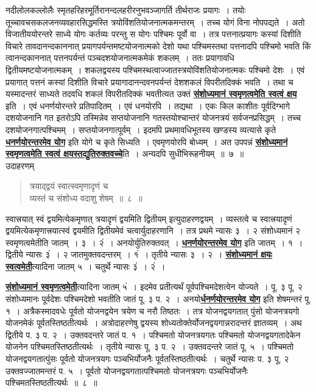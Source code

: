 \documentclass[11pt, openany]{book}
\begin{document}
\noindent नदीलोलकल्लोलैः स्मृतहरिहरमूर्तिरानन्दलहरीरनुभवञ्जागर्ति तीर्थराजः प्रयागः~।
तयोः तूच्चावचसकलजनव्यवहारसिद्धमस्ति त्रयोविंशतियोजनात्मकमन्तरम्~।
तच्च योगं विना नोपपद्यते~। अतो विजातीययोरन्तरे साध्ये योगः कर्तव्यः
परन्तु स योगः पश्चिमः पूर्वो वा~। तत्र पत्तनात्प्रयागः कस्यां दिशीति
विचारे तावदानन्दकाननात् प्रयागपर्यन्तमष्टयोजनात्मको देशो यथा
पश्चिमस्तथा पत्तनादपि पश्चिमो भवति किं त्वानन्दकाननात् पत्तनपर्यन्तं
पञ्चदशयोजनात्मकमेकं शकलम्~। ततः प्रयागावधि द्वितीयमष्टयोजनात्मकम्~। 
शकलद्वयस्य पश्चिमस्थत्वाज्जातस्त्रयोविंशतियोजनात्मकः पश्चिमो देशः~। एवं
प्रयागात् पत्तनं कस्यां दिशीति विचारे प्रयागादानन्दवनपर्यन्तं देशशकलं विपरीतदिक्कं
भवति~। तथा च यस्मादन्तरं साध्यते तदवधि शकलं विपरीतदिक्कं
भवतीत्यत उक्तं \hyperref[7]{\textbf{संशोध्यमानं स्वमृणत्वमेति स्वत्वं क्षय}} इति~। एवं
धनर्णयोरन्तरे प्रतिपादितम्~। एवं धनयोरपि~। तद्यथा~। एकः किल काशीतः
पूर्वदिग्भागे दशयोजनानि गत इतरोऽपि तस्मिन्नेव सप्तयोजनानि
गतस्तयोश्चान्तरं योजनत्रयं सर्वजनप्रसिद्धम्~। तच्च दशयोजनगात्पश्चिमम्~।
सप्तयोजनगात्पूर्वम्~। इदमपि प्रथमावधिभूतस्य खण्डस्य व्यत्यासे कृते \hyperref[3]{\textbf{धनर्णयोरन्तरमेव योग}} इति योगे च कृते सिध्यति~। एवमृणयोरपि बोध्यम्~। अत उपपन्नं \hyperref[7]{\textbf{संशोध्यमानं
स्वमृणत्वमेति स्वत्वं क्षयस्तद्युतिरुक्तवच्चे}}ति~। अन्यदपि सुधीभिरूहनीयम्~॥~७~॥\\

\vspace{-2mm}
{\bqt उदाहरणम्\textendash \,}
\begin{quote}
    {\eg
 त्रयाद्द्वयं स्वात्स्वमृणादृणं च \\
 व्यस्तं च संशोध्य वदाशु शेषम्~॥~८~॥}
\end{quote}

स्वात्त्रयात् स्वं द्वयमित्येकमृणात् त्रयादृणं द्वयमिति
द्वितीयम् इत्युदाहरणद्वयम्~। व्यस्तत्वे च स्वात्त्रयादृणं द्वयमित्येकमृणात्त्रयात्स्वं द्वयमीति द्वितीयमेवं चत्वार्युदाहरणानि~। तत्र प्रथमे न्यासः ३~। २ संशोध्यमानं २ स्वमृणत्वमेतीति जातम्~। ३~। २ं~। अनयोर्युतिरुक्तवत्~। \hyperref[3]{\textbf{धनर्णयोरन्तरमेव योग}} इति जातम्~। १~। द्वितीये न्यासः ३ं~। २ जातमुक्तवदन्तरम्~। १ं~। तृतीये
न्यासः ३~। २~। \hyperref[7]{\textbf{संशोध्यमानं क्षयः स्वत्वमेती}}त्यादिना जातम् ५~। चतुर्थे न्यासः ३ं~। २ं~।
\afterpage{\fancyhead[LE,RO]{\thepage}}
\cfoot{}
\newpage

\noindent \hyperref[7]{\textbf{संशोध्यमानं स्वमृणत्वमेती}}त्यादिना जातम् ५ं~। इदमेव प्रतीत्यर्थं
पूर्वपश्चिमदेशत्वेन योज्यते~। पू. ३ पू. २ संशोध्यमानः पूर्वदेशः
पश्चिमदेशो भवतीति जातं पू. ३ प. २~। अनयो\hyperref[3]{\textbf{र्धनर्णयोरन्तरमेव योग}} इति शेषमन्तरं
पू. १~। अत्रैकस्मादवधेः पूर्वतो योजनद्वयेन त्रयेण च नरौ तिष्ठतः~।
तत्र योजनद्वयगतात् पुंसो योजनत्रयगो योजनमेकं पूर्वतस्तिष्ठतीत्यर्थः~।
अत्रोदाहरणेषु द्वयस्य शोध्यतोक्तेर्योजनद्वयगान्नरादन्तरं ज्ञातव्यम्~। 
अथ द्वितीये प. ३ प. २~। उक्तवदन्तरे जातं प. १~। पश्चिमतो योजनत्रयगतः पश्चिमतो
योजनद्वयगतादेकेन योजनेन पश्चिमतस्तिष्ठतीत्यर्थः~। तृतीये न्यासः पू. ३
प. २~। उक्तवदन्तरे जातं पू. ५~। पश्चिमतो योजनद्वयगतात्पुंसः पूर्वतो
योजनत्रयगः पञ्चभिर्योजनैः पूर्वतस्तिष्ठतीत्यर्थः~। चतुर्थे न्यासः प. ३
पू. २ उक्तवज्जातमन्तरं प. ५~। पूर्वतो योजनद्वयगतात्पश्चिमतो योजनत्रयगः
पञ्चभिर्योजनैः पश्चिमतस्तिष्ठतीत्यर्थः~॥~८~॥\\
\end{document}
